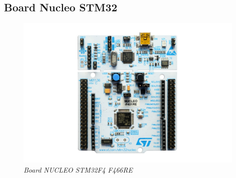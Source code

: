 \documentclass[D:/Latex/Internship/Report/Latex/Report.tex]{subfiles}
\begin{document}
		\subsection{Board Nucleo STM32}
		\label{subsec:Board Nucleo STM32}
			\begin{figure}[h!]
				\centering
				\includegraphics[width = 0.9\linewidth]{Figure/Board.pdf}
				\caption{\it Board NUCLEO STM32F4 F466RE}
			\end{figure}
\end{document}
